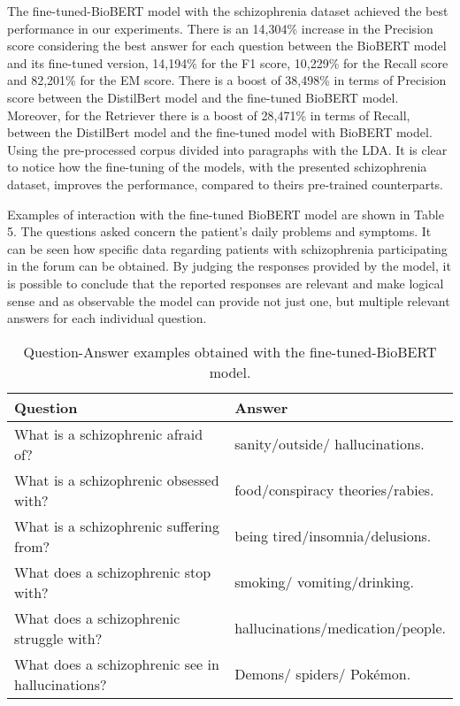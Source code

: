 \documentclass[runningheads]{llncs}
\begin{document}
The fine-tuned-BioBERT model with the schizophrenia dataset achieved the best performance in our experiments.
There is an 14,304\% increase in the Precision score considering the best answer for each question between the BioBERT model and its fine-tuned version, 14,194\% for the F1 score, 10,229\% for the Recall score and 82,201\% for the EM score.
There is a boost of 38,498\% in terms of Precision score between the DistilBert model and the fine-tuned BioBERT model.
Moreover, for the Retriever there is a boost of 28,471\% in terms of Recall, between the DistilBert model and the fine-tuned model with BioBERT model. Using the pre-processed corpus divided into paragraphs with the LDA.
It is clear to notice how the fine-tuning of the models, with the presented schizophrenia dataset, improves the performance, compared to theirs pre-trained counterparts.


Examples of interaction with the fine-tuned BioBERT model are shown in Table 5. The questions asked concern the patient's daily problems and symptoms. It can be seen how specific data regarding patients with schizophrenia participating in the forum can be obtained. By judging the responses provided by the model, it is possible to conclude that the reported responses are relevant and make logical sense and as observable the model can provide not just one, but multiple relevant answers for each individual question.

\begin{table}
 \centering
\caption{Question-Answer examples obtained with the fine-tuned-BioBERT model.}\label{tab1}
\begin{tabular}{|l|l|}
\hline
   Question & Answer \\
\hline
  What is a schizophrenic afraid of?    & sanity/outside/ hallucinations. \\ 
  What is a schizophrenic obsessed with?    & food/conspiracy theories/rabies.\\ 
  What is a schizophrenic suffering from? & being tired/insomnia/delusions.\\
  What does a schizophrenic stop with? & smoking/ vomiting/drinking.  \\ 
  What does a schizophrenic struggle with? & hallucinations/medication/people. \\
  What does a schizophrenic see in hallucinations? & Demons/ spiders/ Pokémon.  \\ 
  
\hline
\end{tabular}
\end{table}
\end{document}
